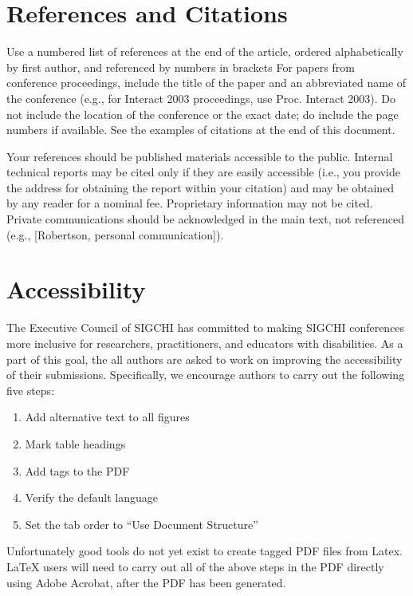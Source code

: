 \documentclass{chi-ext}
\begin{document}
\section{References and Citations}
Use a numbered list of references at the end of the article, ordered alphabetically by first author, and referenced by numbers in brackets \cite{Anderson92,Klemmer02,Mather00,Zellweger01}
For papers from conference proceedings, include the title of the paper and an abbreviated name of the conference (e.g., for Interact 2003 proceedings, use Proc. Interact 2003). 
Do not include the location of the conference or the exact date; do include the page numbers if available. 
See the examples of citations at the end of this document. 

Your references should be published materials accessible to the public.  
Internal technical reports may be cited only if they are easily accessible (i.e., you provide the address for obtaining the report within your citation) and may be obtained by any reader for a nominal fee.  
Proprietary information may not be cited. 
Private communications should be acknowledged in the main text, not referenced  (e.g., [Robertson, personal communication]).

\section{Accessibility}
The Executive Council of SIGCHI has committed to making SIGCHI conferences more inclusive for researchers, practitioners, and educators with disabilities. As a part of this goal, the all authors are asked to work on improving the accessibility of their submissions. Specifically, we encourage authors to carry out the following five steps:
\begin{enumerate}
        \item Add alternative text to all figures
        \item Mark table headings
        \item Add tags to the PDF
        \item Verify the default language
        \item Set the tab order to ``Use Document Structure''
\end{enumerate}
Unfortunately good tools do not yet exist to create tagged PDF files from Latex. LaTeX users will need to carry out all of the above steps in the PDF directly using Adobe Acrobat, after the PDF has been generated.
 
\end{document}

